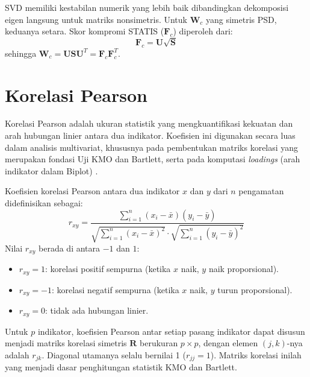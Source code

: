 SVD memiliki kestabilan numerik yang lebih baik dibandingkan dekomposisi eigen langsung untuk matriks nonsimetris. Untuk $\mathbf{W}_c$ yang simetris PSD, keduanya setara. Skor kompromi STATIS ($\mathbf{F}_c$) diperoleh dari:
\begin{equation}
  \mathbf{F}_c = \mathbf{U} \sqrt{\mathbf{S}}
\end{equation}
sehingga $\mathbf{W}_c = \mathbf{U}\mathbf{S}\mathbf{U}^T = \mathbf{F}_c\mathbf{F}_c^T$.

\section{\normalsize Korelasi Pearson}

Korelasi Pearson adalah ukuran statistik yang mengkuantifikasi kekuatan dan arah hubungan linier antara dua indikator. Koefisien ini digunakan secara luas dalam analisis multivariat, khususnya pada pembentukan matriks korelasi yang merupakan fondasi Uji KMO dan Bartlett, serta pada komputasi \textit{loadings} (arah indikator dalam Biplot) \citep{johnson2007}.

\begin{definition}
  Koefisien korelasi Pearson antara dua indikator $x$ dan $y$ dari $n$ pengamatan didefinisikan sebagai:
  \begin{equation}
    r_{xy} = \frac{\displaystyle\sum_{i=1}^{n}(x_i - \bar{x})(y_i - \bar{y})}{\sqrt{\displaystyle\sum_{i=1}^{n}(x_i - \bar{x})^2} \cdot \sqrt{\displaystyle\sum_{i=1}^{n}(y_i - \bar{y})^2}}
  \end{equation}
  Nilai $r_{xy}$ berada  di antara $-1$ dan $1$:
  \begin{itemize}
    \item $r_{xy} = 1$: korelasi positif sempurna (ketika $x$ naik, $y$ naik proporsional).
    \item $r_{xy} = -1$: korelasi negatif sempurna (ketika $x$ naik, $y$ turun proporsional).
    \item $r_{xy} = 0$: tidak ada hubungan linier.
  \end{itemize}
\end{definition}

\begin{remark}
  Untuk $p$ indikator, koefisien Pearson antar setiap pasang indikator dapat disusun menjadi matriks korelasi simetris $\mathbf{R}$ berukuran $p \times p$, dengan elemen $(j,k)$-nya adalah $r_{jk}$. Diagonal utamanya selalu bernilai 1 ($r_{jj} = 1$). Matriks korelasi inilah yang menjadi dasar penghitungan statistik KMO dan Bartlett.
\end{remark}

